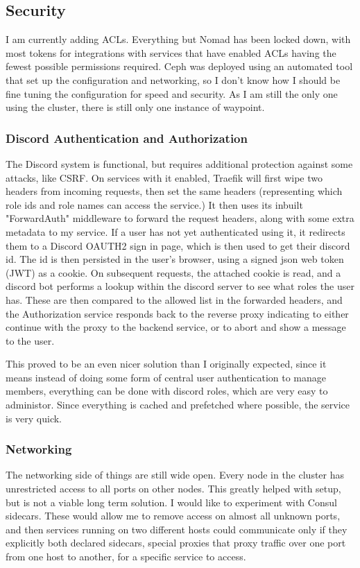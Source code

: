 \documentclass{article}
\begin{document}
\subsection{Security}
I am currently adding ACLs. Everything but Nomad has been locked down, with most tokens for integrations with services that have enabled ACLs having the fewest possible permissions required. Ceph was deployed using an automated tool that set up the configuration and networking, so I don't know how I should be fine tuning the configuration for speed and security. As I am still the only one using the cluster, there is still only one instance of waypoint.

\subsubsection{Discord Authentication and Authorization}
The Discord system is functional, but requires additional protection against some attacks, like CSRF. On services with it enabled, Traefik will first wipe two headers from incoming requests, then set the same headers (representing which role ids and role names can access the service.) It then uses its inbuilt "ForwardAuth" middleware to forward the request headers, along with some extra metadata to my service. If a user has not yet authenticated using it, it redirects them to a Discord OAUTH2 sign in page, which is then used to get their discord id. The id is then persisted in the user's browser, using a signed json web token (JWT) as a cookie. On subsequent requests, the attached cookie is read, and a discord bot performs a lookup within the discord server to see what roles the user has. These are then compared to the allowed list in the forwarded headers, and the Authorization service responds back to the reverse proxy indicating to either continue with the proxy to the backend service, or to abort and show a message to the user.

This proved to be an even nicer solution than I originally expected, since it means instead of doing some form of central user authentication to manage members, everything can be done with discord roles, which are very easy to administor. Since everything is cached and prefetched where possible, the service is very quick.

\subsubsection{Networking}
The networking side of things are still wide open. Every node in the cluster has unrestricted access to all ports on other nodes. This greatly helped with setup, but is not a viable long term solution. I would like to experiment with Consul sidecars. These would allow me to remove access on almost all unknown ports, and then services running on two different hosts could communicate only if they explicitly both declared sidecars, special proxies that proxy traffic over one port from one host to another, for a specific service to 
access.
\end{document}

